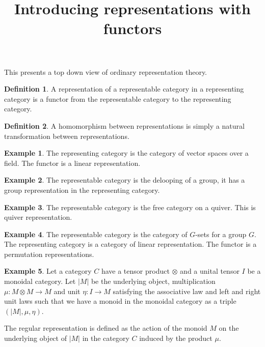 \documentclass[10pt]{article}
\theoremstyle{plain}%
\theoremstyle{definition}
\newtheorem{definition}{Definition}[section]
\newtheorem{example}{Example}[section]
\theoremstyle{remark}
\begin{document}
\title{Introducing representations with functors}

\maketitle

This presents a top down view of ordinary representation theory.

\begin{definition}
	A representation of a representable category in a representing category is a functor from the representable category to the representing category.
\end{definition}

\begin{definition}
	A homomorphism between representations is simply a natural transformation between representations.
\end{definition}

\begin{example}
	The representing category is the category of vector spaces over a field. The functor is a linear representation.
\end{example}

\begin{example}
	The representable category is the delooping of a group, it has a group representation in the representing category.
\end{example}

\begin{example}
	The representable category is the free category on a quiver. This is quiver representation.
\end{example}

\begin{example}
	The representable category is the category of $G$-sets for a group $G$. The representing category is a category of linear representation. The functor is a permutation representations.	
\end{example}

\begin{example}
	Let a category $C$ have a tensor product $\otimes$ and a unital tensor $I$ be a monoidal category. Let $|M|$ be the underlying object, multiplication $\mu : M \otimes M \rightarrow M$ and unit $\eta : I \rightarrow M$  satisfying the associative law and left and right unit laws such that we have a monoid in the monoidal category as a triple $(|M|, \mu, \eta)$.

	The regular representation is defined as the action of the monoid $M$ on the underlying object of $|M|$ in the category $C$ induced by the product $\mu$.
\end{example}
\end{document}
